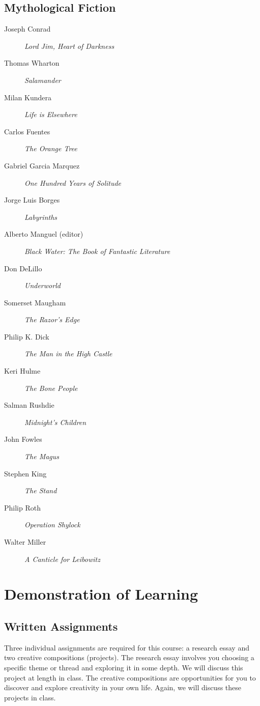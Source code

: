 \documentclass[10pt,DIV09,letterpaper,oneside,headsepline]{scrreprt}
\begin{document}
\subsection{Mythological Fiction}
\begin{description}
\item [Joseph Conrad] \textit{Lord Jim, Heart of Darkness\/}
\item [Thomas Wharton] \textit{Salamander\/}
\item [Milan Kundera] \textit{Life is Elsewhere\/}
\item [Carlos Fuentes] \textit{The Orange Tree\/}
\item [Gabriel Garcia Marquez] \textit{One Hundred Years of Solitude\/}
\item [Jorge Luis Borges] \textit{Labyrinths\/}
\item [Alberto Manguel (editor)] \textit{Black Water: The Book of
Fantastic Literature\/}
\item [Don DeLillo] \textit{Underworld\/}
\item [Somerset Maugham] \textit{The Razor's Edge\/}
\item [Philip K. Dick] \textit{The Man in the High Castle\/}
\item [Keri Hulme] \textit{The Bone People\/}
\item [Salman Rushdie] \textit{Midnight's Children\/}
\item [John Fowles] \textit{The Magus\/}
\item [Stephen King] \textit{The Stand\/}
\item [Philip Roth] \textit{Operation Shylock\/}
\item [Walter Miller] \textit{A Canticle for Leibowitz\/}
\end{description}

\section{Demonstration of Learning}

\subsection{Written Assignments}
Three individual assignments are required for this course: a research
essay and two creative compositions (projects). The research essay involves you choosing a specific theme or thread and exploring it in
some depth. We will discuss this project at length in class. The
creative compositions are opportunities for you to discover
and explore creativity in your own life. Again, we will
discuss these projects in class.
\end{document}
